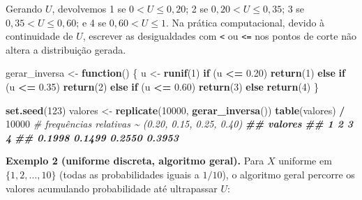 \documentclass[
  portuguese,
  11pt,
  openany]{book}
\newenvironment{Shaded}{\begin{snugshade}}{\end{snugshade}}
\newcommand{\CommentTok}[1]{\textcolor[rgb]{0.56,0.35,0.01}{\textit{#1}}}
\newcommand{\ControlFlowTok}[1]{\textcolor[rgb]{0.13,0.29,0.53}{\textbf{#1}}}
\newcommand{\DecValTok}[1]{\textcolor[rgb]{0.00,0.00,0.81}{#1}}
\newcommand{\DocumentationTok}[1]{\textcolor[rgb]{0.56,0.35,0.01}{\textbf{\textit{#1}}}}
\newcommand{\FloatTok}[1]{\textcolor[rgb]{0.00,0.00,0.81}{#1}}
\newcommand{\FunctionTok}[1]{\textcolor[rgb]{0.13,0.29,0.53}{\textbf{#1}}}
\newcommand{\NormalTok}[1]{#1}
\newcommand{\OtherTok}[1]{\textcolor[rgb]{0.56,0.35,0.01}{#1}}
\newcommand{\SpecialCharTok}[1]{\textcolor[rgb]{0.81,0.36,0.00}{\textbf{#1}}}
\begin{document}
Gerando \(U\), devolvemos 1 se \(0 < U \leq 0{,}20\); 2 se
\(0{,}20 < U \leq 0{,}35\); 3 se \(0{,}35 < U \leq 0{,}60\); e 4 se
\(0{,}60 < U \leq 1\). Na prática computacional, devido à continuidade de \(U\), escrever
as desigualdades com \texttt{\textless{}} ou \texttt{\textless{}=} nos pontos de corte não altera a distribuição gerada.

\begin{Shaded}
\begin{Highlighting}[]
\NormalTok{gerar\_inversa }\OtherTok{\textless{}{-}} \ControlFlowTok{function}\NormalTok{() \{}
\NormalTok{  u }\OtherTok{\textless{}{-}} \FunctionTok{runif}\NormalTok{(}\DecValTok{1}\NormalTok{)}
  \ControlFlowTok{if}\NormalTok{ (u }\SpecialCharTok{\textless{}=} \FloatTok{0.20}\NormalTok{)      }\FunctionTok{return}\NormalTok{(}\DecValTok{1}\NormalTok{)}
  \ControlFlowTok{else} \ControlFlowTok{if}\NormalTok{ (u }\SpecialCharTok{\textless{}=} \FloatTok{0.35}\NormalTok{) }\FunctionTok{return}\NormalTok{(}\DecValTok{2}\NormalTok{)}
  \ControlFlowTok{else} \ControlFlowTok{if}\NormalTok{ (u }\SpecialCharTok{\textless{}=} \FloatTok{0.60}\NormalTok{) }\FunctionTok{return}\NormalTok{(}\DecValTok{3}\NormalTok{)}
  \ControlFlowTok{else}                \FunctionTok{return}\NormalTok{(}\DecValTok{4}\NormalTok{)}
\NormalTok{\}}

\FunctionTok{set.seed}\NormalTok{(}\DecValTok{123}\NormalTok{)}
\NormalTok{valores }\OtherTok{\textless{}{-}} \FunctionTok{replicate}\NormalTok{(}\DecValTok{10000}\NormalTok{, }\FunctionTok{gerar\_inversa}\NormalTok{())}
\FunctionTok{table}\NormalTok{(valores) }\SpecialCharTok{/} \DecValTok{10000}     \CommentTok{\# frequências relativas \textasciitilde{} (0.20, 0.15, 0.25, 0.40)}
\DocumentationTok{\#\# valores}
\DocumentationTok{\#\#      1      2      3      4 }
\DocumentationTok{\#\# 0.1998 0.1499 0.2550 0.3953}
\end{Highlighting}
\end{Shaded}

\textbf{Exemplo 2 (uniforme discreta, algoritmo geral).} Para \(X\) uniforme em
\(\{1, 2, \ldots, 10\}\) (todas as probabilidades iguais a \(1/10\)), o algoritmo geral
percorre os valores acumulando probabilidade até ultrapassar \(U\):
\end{document}
